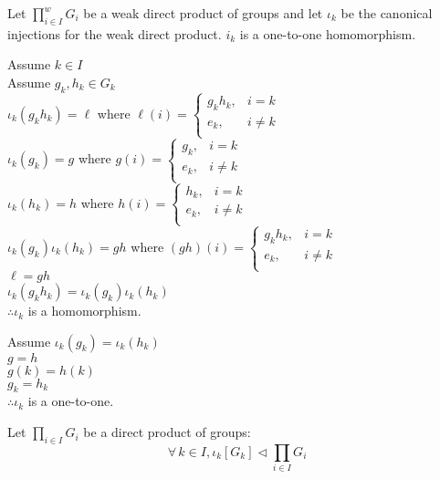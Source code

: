 \documentclass[letterpaper,12pt,fleqn]{article}
\newcommand{\direct}{\prod_{i\in I}G_i}
\newcommand{\iweak}{\prod_{i\in I}^wG_i}
\renewcommand{\i}{\iota}
\newcommand{\n}{\triangleleft}
\begin{document}
\begin{theorem}
  Let $\iweak$ be a weak direct product of groups and let $\i_k$ be the
  canonical injections for the weak direct product. $i_k$ is a one-to-one
  homomorphism.
\end{theorem}

\begin{theproof}
  Assume $k\in I$ \\
  Assume $g_k,h_k\in G_k$ \\
  $\i_k(g_kh_k)=\ell$ where $\ell(i)=\begin{cases}
  g_kh_k, & i=k \\
  e_k, &i\ne k \\
  \end{cases}$ \\
  $\i_k(g_k)=g$ where $g(i)=\begin{cases}
  g_k, & i=k \\
  e_k, &i\ne k \\
  \end{cases}$ \\
  $\i_k(h_k)=h$ where $h(i)=\begin{cases}
  h_k, & i=k \\
  e_k, &i\ne k \\
  \end{cases}$ \\
  $\i_k(g_k)\i_k(h_k)=gh$ where $(gh)(i)=\begin{cases}
  g_kh_k, & i=k \\
  e_k, &i\ne k \\
  \end{cases}$ \\
  $\ell=gh$ \\
  $\i_k(g_kh_k)=\i_k(g_k)\i_k(h_k)$ \\
  $\therefore \i_k$ is a homomorphism.

  Assume $\i_k(g_k)=\i_k(h_k)$ \\
  $g=h$ \\
  $g(k)=h(k)$ \\
  $g_k=h_k$ \\
  $\therefore \i_k$ is a one-to-one.
\end{theproof}

\begin{theorem}
  Let $\direct$ be a direct product of groups:
  \[\forall\,k\in I,\i_k[G_k]\n\direct\]
\end{theorem}
\end{document}
